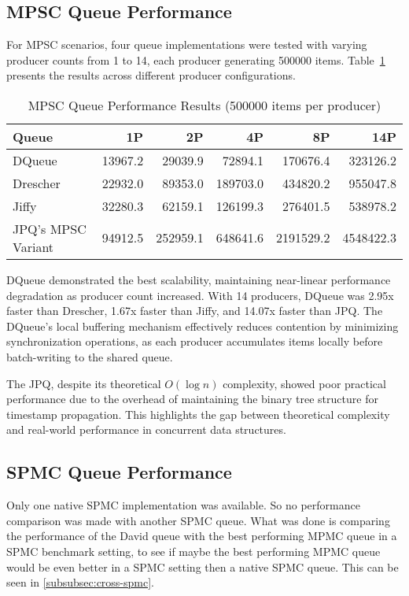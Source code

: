 \subsection{\acf{MPSC} Queue Performance}
For \ac{MPSC} scenarios, four queue implementations were tested with varying producer counts from 1 to 14, each producer generating 500000 items. Table~\ref{tab:mpsc-results} presents the results across different producer configurations.

\begin{table}[htb]
\centering
\caption{\ac{MPSC} Queue Performance Results (500000 items per producer)}
\label{tab:mpsc-results}
\begin{tabular}{@{}lrrrrr@{}}
\toprule
Queue & 1P & 2P & 4P & 8P & 14P \\
\midrule
DQueue & 13967.2 & 29039.9 & 72894.1 & 170676.4 & 323126.2 \\
Drescher & 22932.0 & 89353.0 & 189703.0 & 434820.2 & 955047.8 \\
Jiffy & 32280.3 & 62159.1 & 126199.3 & 276401.5 & 538978.2 \\
\ac{JPQ}'s \ac{MPSC} Variant & 94912.5 & 252959.1 & 648641.6 & 2191529.2 & 4548422.3 \\
\bottomrule
\end{tabular}
\end{table}

DQueue demonstrated the best scalability, maintaining near-linear performance degradation as producer count increased. With 14 producers, DQueue was 2.95x faster than Drescher, 1.67x faster than Jiffy, and 14.07x faster than \ac{JPQ}. The DQueue's local buffering mechanism effectively reduces contention by minimizing synchronization operations, as each producer accumulates items locally before batch-writing to the shared queue.

The \ac{JPQ}, despite its theoretical $O(\log n)$ complexity, showed poor practical performance due to the overhead of maintaining the binary tree structure for timestamp propagation. This highlights the gap between theoretical complexity and real-world performance in concurrent data structures.

\subsection{\acf{SPMC} Queue Performance}
Only one native \ac{SPMC} implementation was available. So no performance comparison was made with another \ac{SPMC} queue. What was done is comparing the performance of the David queue with the best performing \ac{MPMC} queue in a \ac{SPMC} benchmark setting, to see if maybe the best performing \ac{MPMC} queue would be even better in a \ac{SPMC} setting then a native \ac{SPMC} queue. This can be seen in \cref{subsubsec:cross-spmc}.

